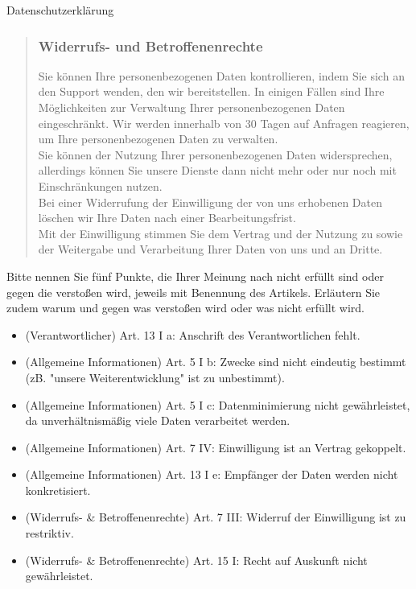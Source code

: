 \documentclass{exercisesheet}
\begin{document}
\begin{exercise}{Datenschutzerklärung}
\begin{quote}
    \subsubsection*{Widerrufs- und Betroffenenrechte}
    Sie können Ihre personenbezogenen Daten kontrollieren, indem Sie sich an den Support wenden, den wir bereitstellen. In einigen Fällen sind Ihre Möglichkeiten zur Verwaltung Ihrer personenbezogenen Daten eingeschränkt. Wir werden innerhalb von 30 Tagen auf Anfragen reagieren, um Ihre personenbezogenen Daten zu verwalten.\\
    Sie können der Nutzung Ihrer personenbezogenen Daten widersprechen, allerdings können Sie unsere Dienste dann nicht mehr oder nur noch mit Einschränkungen nutzen.\\
    Bei einer Widerrufung der Einwilligung der von uns erhobenen Daten löschen wir Ihre Daten nach einer Bearbeitungsfrist.
    \vspace{1em}\\
    Mit der Einwilligung stimmen Sie dem Vertrag und der Nutzung zu sowie der Weitergabe und Verarbeitung Ihrer Daten von uns und an Dritte.
  \end{quote}

  Bitte nennen Sie fünf Punkte, die Ihrer Meinung nach nicht erfüllt sind oder gegen die verstoßen wird, jeweils mit Benennung des Artikels. Erläutern Sie zudem warum und gegen was verstoßen wird oder was nicht erfüllt wird.

  \begin{solution}
    \begin{itemize}
      \item (Verantwortlicher) Art. 13 I a: Anschrift des Verantwortlichen fehlt.
      \item (Allgemeine Informationen) Art. 5 I b: Zwecke sind nicht eindeutig bestimmt (zB. "unsere Weiterentwicklung" ist zu unbestimmt).
      \item (Allgemeine Informationen) Art. 5 I c: Datenminimierung nicht gewährleistet, da unverhältnismäßig viele Daten verarbeitet werden.
      \item (Allgemeine Informationen) Art. 7 IV: Einwilligung ist an Vertrag gekoppelt.
      \item (Allgemeine Informationen) Art. 13 I e: Empfänger der Daten werden nicht konkretisiert.
      \item (Widerrufs- \& Betroffenenrechte) Art. 7 III: Widerruf der Einwilligung ist zu restriktiv.
      \item (Widerrufs- \& Betroffenenrechte) Art. 15 I: Recht auf Auskunft nicht gewährleistet.
    \end{itemize}
  \end{solution}
\end{exercise}
\end{document}
